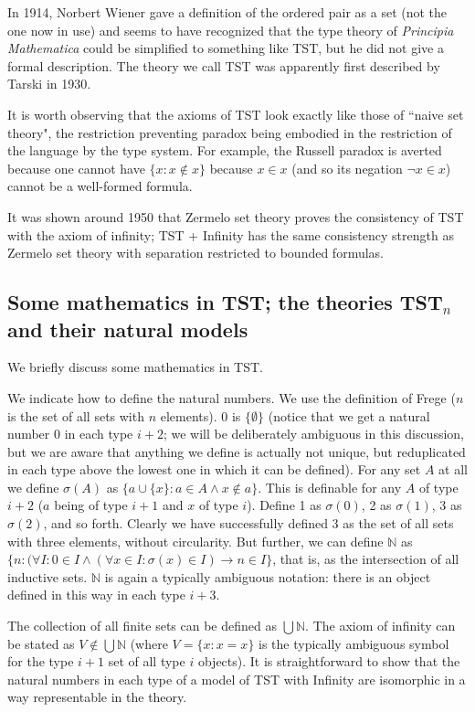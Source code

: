 \documentclass[12pt]{article}
\begin{document}
In 1914, Norbert Wiener gave a definition of the ordered pair as a set (not the one now in use) and seems to have recognized that the type theory of {\em Principia Mathematica\/} could be simplified to something like TST, but he did not give a formal description.  The theory we call TST was apparently first described by Tarski in 1930.

It is worth observing that the axioms of TST look exactly like those of ``naive set theory", the restriction preventing paradox being embodied in the restriction of the language by the type system.
For example, the Russell paradox is averted because one cannot have $\{x:x \not\in x\}$ because $x \in x$ (and so its negation $\neg x \in x$) cannot be a well-formed formula.

It was shown around 1950 that Zermelo set theory proves the consistency of TST with the axiom of infinity;  TST + Infinity has the same consistency strength as
Zermelo set theory with separation restricted to bounded formulas.


\newpage

\subsection{Some mathematics in TST;  the theories TST$_n$ and their natural models}

We briefly discuss some mathematics in TST.

We indicate how to define the natural numbers.  We use the definition of Frege ($n$ is the set of all sets with $n$ elements).  0 is $\{\emptyset\}$ (notice that we get a natural number 0 in each type $i+2$;  we will be deliberately ambiguous in this discussion, but we are aware that anything we define is actually not unique, but reduplicated in each type above the lowest one in which it can be defined).  For any set $A$ at all we define $\sigma(A)$ as $\{a \cup \{x\}:a \in A \wedge x \not\in a\}$.  This is definable for any $A$ of type $i+2$ ($a$ being of type $i+1$ and $x$ of type $i$).  Define 1 as $\sigma(0)$, 2 as $\sigma(1)$,  3 as $\sigma(2)$, and so forth.  Clearly we have successfully defined 3 as the set of all sets with three elements, without circularity.
But further, we can define $\mathbb N$ as $\{n:(\forall I:0 \in I \wedge (\forall x \in I:\sigma(x) \in I) \rightarrow n \in I\}$, that is, as the intersection of all inductive sets.
$\mathbb N$ is again a typically ambiguous notation:  there is an object defined in this way in each type $i+3$.

The collection of all finite sets can be defined as $\bigcup \mathbb N$.  The axiom of infinity can be stated as $V \not\in \bigcup \mathbb N$ (where $V= \{x:x=x\}$ is the typically ambiguous symbol for the type $i+1$ set of all type $i$ objects).  It is straightforward to show that the natural numbers in each type of a model of TST with Infinity are isomorphic in a way representable in the theory.
\end{document}
